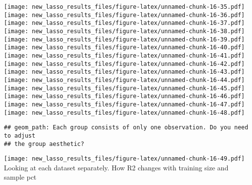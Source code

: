\documentclass[
]{article}
\newenvironment{Shaded}{\begin{snugshade}}{\end{snugshade}}
\newcommand{\ControlFlowTok}[1]{\textcolor[rgb]{0.13,0.29,0.53}{\textbf{#1}}}
\newcommand{\DataTypeTok}[1]{\textcolor[rgb]{0.13,0.29,0.53}{#1}}
\newcommand{\KeywordTok}[1]{\textcolor[rgb]{0.13,0.29,0.53}{\textbf{#1}}}
\newcommand{\NormalTok}[1]{#1}
\newcommand{\OperatorTok}[1]{\textcolor[rgb]{0.81,0.36,0.00}{\textbf{#1}}}
\newcommand{\StringTok}[1]{\textcolor[rgb]{0.31,0.60,0.02}{#1}}
\begin{document}
\texttt{[image: new\_lasso\_results\_files/figure-latex/unnamed-chunk-16-35.pdf]}
\texttt{[image: new\_lasso\_results\_files/figure-latex/unnamed-chunk-16-36.pdf]}
\texttt{[image: new\_lasso\_results\_files/figure-latex/unnamed-chunk-16-37.pdf]}
\texttt{[image: new\_lasso\_results\_files/figure-latex/unnamed-chunk-16-38.pdf]}
\texttt{[image: new\_lasso\_results\_files/figure-latex/unnamed-chunk-16-39.pdf]}
\texttt{[image: new\_lasso\_results\_files/figure-latex/unnamed-chunk-16-40.pdf]}
\texttt{[image: new\_lasso\_results\_files/figure-latex/unnamed-chunk-16-41.pdf]}
\texttt{[image: new\_lasso\_results\_files/figure-latex/unnamed-chunk-16-42.pdf]}
\texttt{[image: new\_lasso\_results\_files/figure-latex/unnamed-chunk-16-43.pdf]}
\texttt{[image: new\_lasso\_results\_files/figure-latex/unnamed-chunk-16-44.pdf]}
\texttt{[image: new\_lasso\_results\_files/figure-latex/unnamed-chunk-16-45.pdf]}
\texttt{[image: new\_lasso\_results\_files/figure-latex/unnamed-chunk-16-46.pdf]}
\texttt{[image: new\_lasso\_results\_files/figure-latex/unnamed-chunk-16-47.pdf]}
\texttt{[image: new\_lasso\_results\_files/figure-latex/unnamed-chunk-16-48.pdf]}

\begin{verbatim}
## geom_path: Each group consists of only one observation. Do you need to adjust
## the group aesthetic?
\end{verbatim}

\texttt{[image: new\_lasso\_results\_files/figure-latex/unnamed-chunk-16-49.pdf]}
Looking at each dataset separately. How R2 changes with training size
and sample pct

\begin{Shaded}
\end{Shaded}
\end{document}
